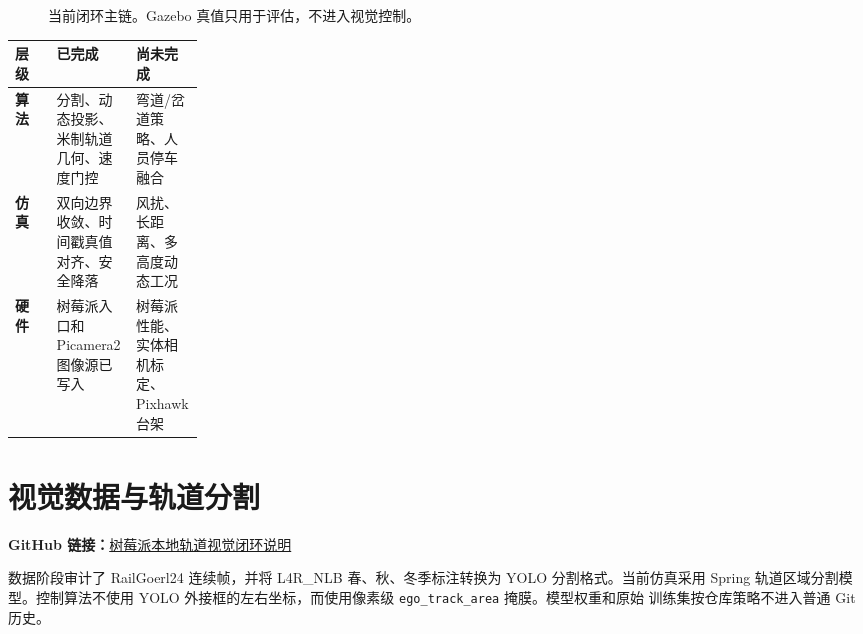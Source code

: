 \documentclass[UTF8,a4paper,11pt,fontset=windows]{ctexart}
\newcommand{\githublink}[2]{%
  \par\smallskip
  \noindent\colorbox{sky}{%
    \parbox{\dimexpr\linewidth-2\fboxsep}{%
      \small\textbf{GitHub 链接：}\href{#1}{\textcolor{linkblue}{#2}}}}
  \par\smallskip}
\newcommand{\code}[1]{\texttt{#1}}
\begin{document}
\begin{figure}[H]
\centering
{}
\caption{当前闭环主链。Gazebo 真值只用于评估，不进入视觉控制。}
\end{figure}

\begin{center}
\begin{tabularx}{0.96\linewidth}{>{\bfseries}p{0.22\linewidth}XX}
\toprule
层级 & 已完成 & 尚未完成 \\
\midrule
算法 & 分割、动态投影、米制轨道几何、速度门控 & 弯道/岔道策略、人员停车融合 \\
仿真 & 双向边界收敛、时间戳真值对齐、安全降落 & 风扰、长距离、多高度动态工况 \\
硬件 & 树莓派入口和 Picamera2 图像源已写入 & 树莓派性能、实体相机标定、Pixhawk 台架 \\
\bottomrule
\end{tabularx}
\end{center}

\section{视觉数据与轨道分割}
\githublink{https://github.com/Yeyu-Tanxue/UAV_control_demo/blob/main/docs/vision/onboard-visual-control.md}
{树莓派本地轨道视觉闭环说明}

数据阶段审计了 RailGoerl24 连续帧，并将 L4R\_NLB 春、秋、冬季标注转换为
YOLO 分割格式。当前仿真采用 Spring 轨道区域分割模型。控制算法不使用 YOLO
外接框的左右坐标，而使用像素级 \code{ego\_track\_area} 掩膜。模型权重和原始
训练集按仓库策略不进入普通 Git 历史。
\end{document}
